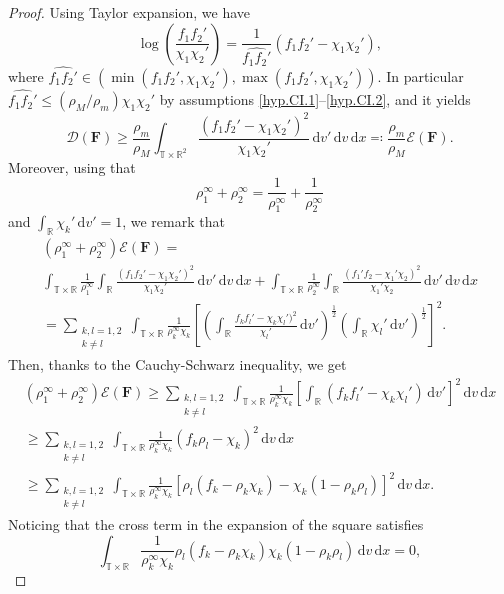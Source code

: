 \documentclass[reqno]{amsart}
\newcommand{\dd}{\,\mathrm{d}}
\newcommand{\R}{\mathbb{R}}
\newcommand{\T}{\mathbb{T}}
\newcommand{\Fbf}{\mathbf{F}}
\numberwithin{equation}{section}
\begin{document}
\begin{proof}
Using Taylor expansion, we have
\[\log\left(\frac{f_1f_2'}{\chi_1\chi_2'}\right)=\frac{1}{\widehat{f_1f_2'}}(f_1f_2'-\chi_1\chi_2'),\]
where $\widehat{f_1f_2'} \in \left(\min(f_1f_2', \chi_1\chi_2'),\max(f_1f_2', \chi_1\chi_2')\right)$. In particular $\widehat{f_1f_2'}\leq (\rho_M/\rho_m)\chi_1\chi_2'$ by assumptions \eqref{hyp.CI.1}--\eqref{hyp.CI.2}, and it yields
\begin{equation}\label{estim.Da}
    \mathcal{D}(\Fbf)\geq \frac{\rho_m}{\rho_M}\int_{\T\times\R^2}\frac{(f_1f_2'-\chi_1\chi_2')^2}{\chi_1\chi_2'}\dd v'\dd v\dd x\eqcolon\frac{\rho_m}{\rho_M}\mathcal{E}(\Fbf).
\end{equation}
Moreover, using that 
\[\rho_1^\infty+\rho_2^\infty=\frac{1}{\rho_1^\infty}+\frac{1}{\rho_2^\infty}\]
and $\int_\R \chi_k'\dd v'=1$, we remark that 
\begin{gather*}
    (\rho_1^\infty+\rho_2^\infty)\mathcal{E}(\Fbf)=\\
    \int_{\T\times\R}\frac{1}{\rho_1^\infty}\int_\R\frac{(f_1f_2'-\chi_1\chi_2')^2}{\chi_1\chi_2'}\dd v'\dd v\dd x+ \int_{\T\times\R}\frac{1}{\rho_2^\infty}\int_\R\frac{(f_1'f_2-\chi_1'\chi_2)^2}{\chi_1'\chi_2}\dd v'\dd v\dd x\\
    = \sum_{\substack{k,l=1,2\\ k\neq l}}\int_{\T\times\R}\frac{1}{\rho_k^\infty\chi_k}\left[\left(\int_\R\frac{f_kf_l'-\chi_k\chi_l')^2}{\chi_l'}\dd v'\right)^{\frac{1}{2}}\left(\int_\R \chi_l'\dd v'\right)^{\frac{1}{2}}\right]^2.
\end{gather*}
Then, thanks to the Cauchy-Schwarz inequality, we get
\begin{gather*}
(\rho_1^\infty+\rho_2^\infty)\mathcal{E}(\Fbf) \geq \sum_{\substack{k,l=1,2\\ k\neq l}}\int_{\T\times\R}\frac{1}{\rho_k^\infty\chi_k}\left[\int_\R(f_kf_l'-\chi_k\chi_l')\dd v'\right]^2\dd v\dd x\\
\geq \sum_{\substack{k,l=1,2\\ k\neq l}}\int_{\T\times\R}\frac{1}{\rho_k^\infty\chi_k}(f_k\rho_l-\chi_k)^2\dd v\dd x\\
\geq \sum_{\substack{k,l=1,2\\ k\neq l}}\int_{\T\times\R}\frac{1}{\rho_k^\infty\chi_k}\left[\rho_l(f_k-\rho_k\chi_k)-\chi_k(1-\rho_k\rho_l)\right]^2\dd v\dd x.
\end{gather*}
Noticing that the cross term in the expansion of the square satisfies
\[ \int_{\T\times\R}\frac{1}{\rho_k^\infty\chi_k}\rho_l(f_k-\rho_k\chi_k)\chi_k(1-\rho_k\rho_l)\dd v\dd x =0,\]

\end{proof}
\end{document}
